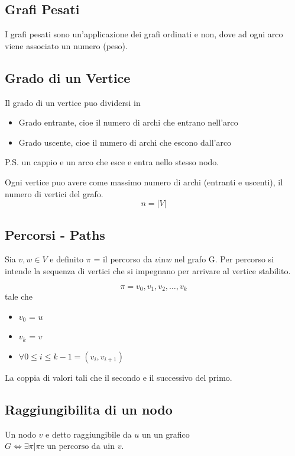 \subsection{Grafi Pesati}
I grafi pesati sono un'applicazione dei grafi ordinati e non, dove ad ogni arco viene associato un numero (peso).

\subsection{Grado di un Vertice}

Il grado di un vertice puo dividersi in 
\begin{itemize}
	\item Grado entrante, cioe il numero di archi che entrano nell'arco
	\item Grado uscente, cioe il numero di archi che escono dall'arco
\end{itemize}

P.S. un cappio e un arco che esce e entra nello stesso nodo.

Ogni vertice puo avere come massimo numero di archi (entranti e uscenti), il numero di vertici del grafo.
$$n = |V|$$

\subsection{Percorsi - Paths}
Sia $v,w \in V$ e definito $\pi$ = il percorso da $v \text{in} w$ nel grafo G. Per percorso si intende la sequenza di vertici che si impegnano per arrivare al vertice stabilito. 

$$\pi = v_0,v_1,v_2,\dots,v_k$$ tale che 

\begin{itemize}
	\item $v_0$ = $u$
	\item $v_k$ = $v$
	\item $\forall  0\le i \le k-1 = (v_i,v_{i+1})$
\end{itemize}

La coppia di valori tali che il secondo e il successivo del primo.

\subsection{Raggiungibilita di un nodo}

Un nodo $v $ e detto raggiungibile da $u$ un un grafico $G \iff \exists \pi | \pi \text{e un percorso da }u \text{in } v$.

